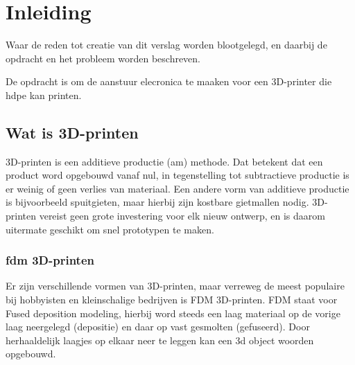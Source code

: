 \chapter{Inleiding}
\label{inleiding}

\begin{center}
    \begin{minipage}{0.5\textwidth}
        \begin{small}
            Waar de reden tot creatie van dit verslag worden blootgelegd, en daarbij de opdracht en het probleem worden beschreven.
        \end{small}
    \end{minipage}
    \vspace{0.5cm}
\end{center}

\noindent De opdracht is om de aanstuur elecronica te maaken voor een 3D-printer die \ac{hdpe} kan printen.

\section{Wat is 3D-printen}

3D-printen is een additieve productie (\ac{am}) methode. Dat betekent dat een product word opgebouwd vanaf nul, in tegenstelling tot subtractieve productie is er weinig of geen verlies van materiaal.
Een andere vorm van additieve productie is bijvoorbeeld spuitgieten, maar hierbij zijn kostbare gietmallen nodig. 3D-printen vereist geen grote investering voor elk nieuw ontwerp, en is daarom uitermate geschikt om snel prototypen te maken. \cite{ATTARAN2017677}

\subsection{\ac{fdm} 3D-printen}

Er zijn verschillende vormen van 3D-printen, maar verreweg de meest populaire bij hobbyisten en kleinschalige bedrijven is FDM 3D-printen. FDM staat voor Fused deposition modeling, hierbij word steeds een laag materiaal op de vorige laag neergelegd (depositie) en daar op vast gesmolten (gefuseerd). Door herhaaldelijk laagjes op elkaar neer te leggen kan een \ac{3d} object woorden opgebouwd.

